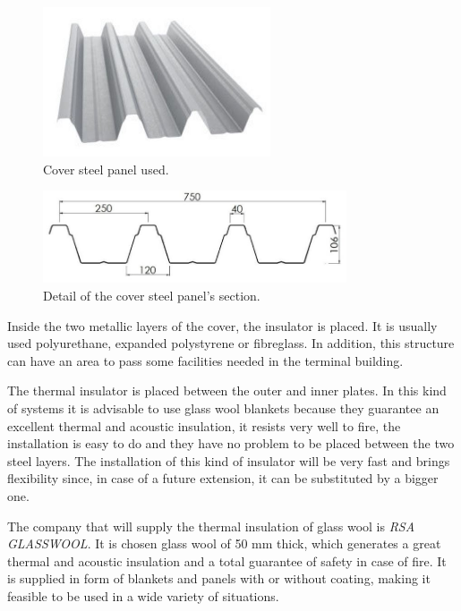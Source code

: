 \begin{figure}[H]
	\centering
	\includegraphics[clip, trim=0cm 0cm 0cm 0cm, width=0.6\textwidth]{./images/cover/profile}
	\caption{Cover steel panel used.}
	\label{profile}
\end{figure}

\begin{figure}[H]
	\centering
	\includegraphics[clip, trim=0cm 0cm 0cm 0cm, width=0.8\textwidth]{./images/cover/profiledimension}
	\caption{Detail of the cover steel panel's section.}
	\label{profiledimension}
\end{figure}

Inside the two metallic layers of the cover, the insulator is placed. It is usually used polyurethane, expanded polystyrene or fibreglass. In addition, this structure can have an area to pass some facilities needed in the terminal building.

The thermal insulator is placed between the outer and inner plates. In this kind of systems it is advisable to use glass wool blankets because they guarantee an excellent thermal and acoustic insulation, it resists very well to fire, the installation is easy to do and they have no problem to be placed between the two steel layers. The installation of this kind of insulator will be very fast and brings flexibility since, in case of a future extension, it can be substituted by a bigger one.

The company that will supply the thermal insulation of glass wool is \textit{RSA GLASSWOOL}. It is chosen glass wool of 50 mm thick, which generates a great thermal and acoustic insulation and a total guarantee of safety in case of fire. It is supplied in form of blankets and panels with or without coating, making it feasible to be used in a wide variety of situations.

